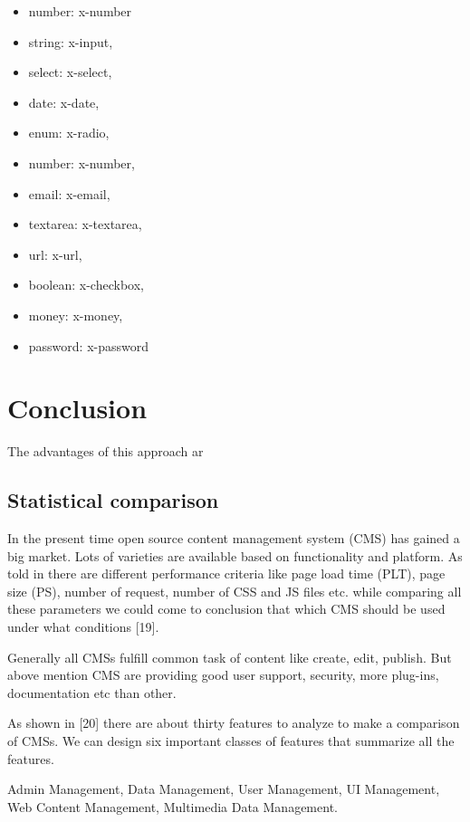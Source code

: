 \documentclass{sig-alternate}
\begin{document}
\begin{itemize}
       \item number: x-number
       \item string: x-input,
       \item select: x-select,
       \item date: x-date,
       \item enum: x-radio,
       \item number: x-number,
       \item email: x-email,
       \item textarea: x-textarea,
       \item url: x-url,
       \item boolean: x-checkbox,
       \item money: x-money,
       \item password: x-password
\end{itemize}


\section{Conclusion}

The advantages of this approach ar

\subsection{Statistical comparison}

In the present time open source content management system (CMS) has gained a big market. Lots of varieties are available based on functionality and platform.
As told in there are different performance criteria like page load time (PLT), page size (PS), number of request, number of CSS and JS files etc. while comparing all these parameters we could come to conclusion that which CMS should be used under what conditions [19].

Generally all CMSs fulfill common task of content like create, edit, publish. But above mention CMS are providing good user support, security, more plug-ins, documentation etc than other.
 
As shown in [20] there are about thirty features to analyze to make a comparison of CMSs. We can design six important classes of features that summarize all the features.

Admin Management, Data Management, User Management, UI Management, Web Content Management, Multimedia Data Management.
\end{document}
